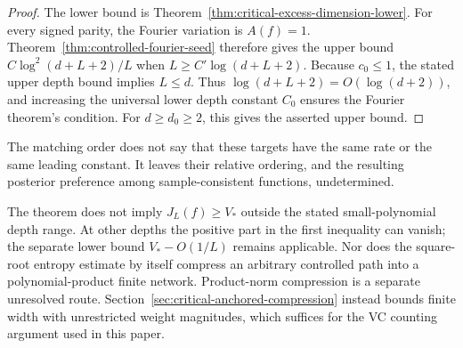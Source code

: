 \begin{proof}
The lower bound is Theorem~\ref{thm:critical-excess-dimension-lower}.
For every signed parity, the Fourier variation is $A(f)=1$.
Theorem~\ref{thm:controlled-fourier-seed} therefore gives the upper
bound $C\log^2(d+L+2)/L$ when $L\ge C'\log(d+L+2)$.
Because $c_0\le1$, the stated upper depth bound implies $L\le d$.
Thus $\log(d+L+2)=O(\log(d+2))$, and increasing the universal lower
depth constant $C_0$ ensures the Fourier theorem's condition.
For $d\ge d_0\ge2$, this gives the asserted upper bound.
\end{proof}

The matching order does not say that these targets have the same rate
or the same leading constant. It leaves their relative ordering, and
the resulting posterior preference among sample-consistent functions,
undetermined.

The theorem does not imply $J_L(f)\ge V_*$ outside the stated
small-polynomial depth range. At other depths the positive part in the
first inequality can vanish; the separate lower bound
$V_*-O(1/L)$ remains applicable. Nor does the square-root entropy
estimate by itself compress an arbitrary controlled path into a
polynomial-product finite network. Product-norm compression is a separate unresolved route.
Section~\ref{sec:critical-anchored-compression} instead bounds finite
width with unrestricted weight magnitudes, which suffices for the
VC counting argument used in this paper.

